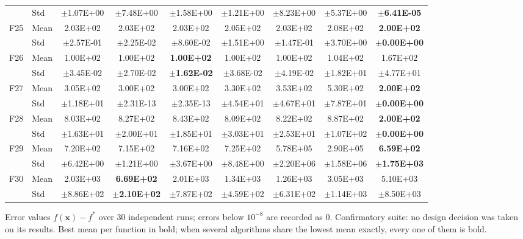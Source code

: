 \begin{table}[htbp]
{\begin{tabular}{clccccccc}
 & Std & $\pm$1.07E+00 & $\pm$7.48E+00 & $\pm$1.58E+00 & $\pm$1.21E+00 & $\pm$8.23E+00 & $\pm$5.37E+00 & $\pm$\textbf{6.41E-05} \\
F25 & Mean & 2.03E+02 & 2.03E+02 & 2.03E+02 & 2.05E+02 & 2.03E+02 & 2.08E+02 & \textbf{2.00E+02} \\
 & Std & $\pm$2.57E-01 & $\pm$2.25E-02 & $\pm$8.60E-02 & $\pm$1.51E+00 & $\pm$1.47E-01 & $\pm$3.70E+00 & $\pm$\textbf{0.00E+00} \\
F26 & Mean & 1.00E+02 & 1.00E+02 & \textbf{1.00E+02} & 1.00E+02 & 1.00E+02 & 1.04E+02 & 1.67E+02 \\
 & Std & $\pm$3.45E-02 & $\pm$2.70E-02 & $\pm$\textbf{1.62E-02} & $\pm$3.68E-02 & $\pm$4.19E-02 & $\pm$1.82E+01 & $\pm$4.77E+01 \\
F27 & Mean & 3.05E+02 & 3.00E+02 & 3.00E+02 & 3.30E+02 & 3.53E+02 & 5.30E+02 & \textbf{2.00E+02} \\
 & Std & $\pm$1.18E+01 & $\pm$2.31E-13 & $\pm$2.35E-13 & $\pm$4.54E+01 & $\pm$4.67E+01 & $\pm$7.87E+01 & $\pm$\textbf{0.00E+00} \\
F28 & Mean & 8.03E+02 & 8.27E+02 & 8.43E+02 & 8.09E+02 & 8.22E+02 & 8.87E+02 & \textbf{2.00E+02} \\
 & Std & $\pm$1.63E+01 & $\pm$2.00E+01 & $\pm$1.85E+01 & $\pm$3.03E+01 & $\pm$2.53E+01 & $\pm$1.07E+02 & $\pm$\textbf{0.00E+00} \\
F29 & Mean & 7.20E+02 & 7.15E+02 & 7.16E+02 & 7.25E+02 & 5.78E+05 & 2.90E+05 & \textbf{6.59E+02} \\
 & Std & $\pm$6.42E+00 & $\pm$1.21E+00 & $\pm$3.67E+00 & $\pm$8.48E+00 & $\pm$2.20E+06 & $\pm$1.58E+06 & $\pm$\textbf{1.75E+03} \\
F30 & Mean & 2.03E+03 & \textbf{6.69E+02} & 2.01E+03 & 1.34E+03 & 1.26E+03 & 3.05E+03 & 5.10E+03 \\
 & Std & $\pm$8.86E+02 & $\pm$\textbf{2.10E+02} & $\pm$7.87E+02 & $\pm$4.59E+02 & $\pm$6.31E+02 & $\pm$1.14E+03 & $\pm$8.50E+03 \\
\bottomrule
\end{tabular}}
\begin{flushleft}\footnotesize
Error values $f(\mathbf{x})-f^{*}$ over 30 independent runs; errors below $10^{-8}$ are recorded as 0. Confirmatory suite: no design decision was taken on its results. Best mean per function in bold; when several algorithms share the lowest mean exactly, every one of them is bold.
\end{flushleft}
\end{table}
